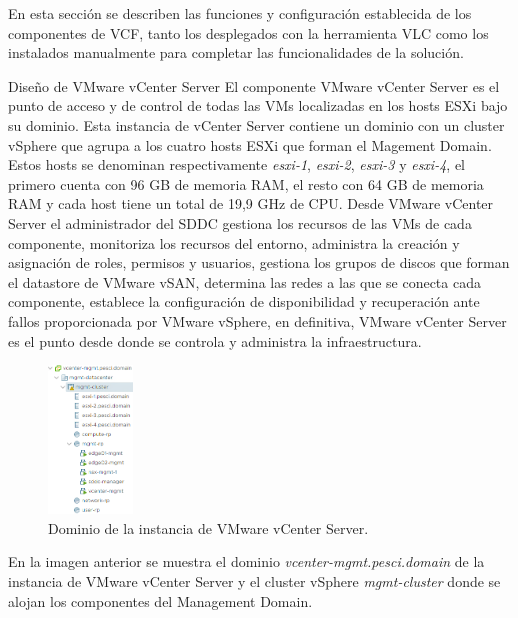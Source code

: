 En esta sección se describen las funciones y configuración establecida de los componentes de VCF, tanto los desplegados con la herramienta VLC como los instalados manualmente para completar las funcionalidades de la solución.
\begin{subsubsection}{Diseño de VMware vCenter Server}
  \label{subsubsec:diseno-vcenter}
El componente VMware vCenter Server es el punto de acceso y de control de todas las VMs localizadas en los hosts ESXi bajo su dominio. Esta instancia de vCenter Server contiene un dominio con un cluster vSphere que agrupa a los cuatro hosts ESXi que forman el Magement Domain. Estos hosts se denominan respectivamente \textit{esxi-1}, \textit{esxi-2}, \textit{esxi-3} y \textit{esxi-4}, el primero cuenta con 96 GB de memoria RAM, el resto con 64 GB de memoria RAM y cada host tiene un total de 19,9 GHz de CPU. Desde VMware vCenter Server el administrador del SDDC gestiona los recursos de las VMs de cada componente, monitoriza los recursos del entorno, administra la creación y asignación de roles, permisos y usuarios, gestiona los grupos de discos que forman el datastore de VMware vSAN, determina las redes a las que se conecta cada componente, establece la configuración de disponibilidad y recuperación ante fallos proporcionada por VMware vSphere, en definitiva, VMware vCenter Server es el punto desde donde se controla y administra la infraestructura.
\begin{figure}[h]
  \centering
  \includegraphics[width=0.2\textwidth]{imaxes/pruebaconcepto/clusterVCenterServer.png}
  \caption{Dominio de la instancia de VMware vCenter Server.}
  \label{fig:cluster-vCenter-Server}
\end{figure}
\FloatBarrier
En la imagen anterior se muestra el dominio \textit{vcenter-mgmt.pesci.domain} de la instancia de VMware vCenter Server y el cluster vSphere \textit{mgmt-cluster} donde se alojan los componentes del Management Domain. 

\end{subsubsection}
